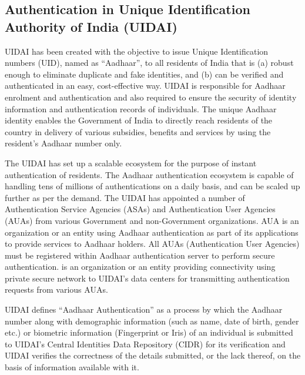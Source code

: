 \begin{multicols}{2}
\section*{Authentication in Unique Identification Authority of India (UIDAI)}

UIDAI has been created with the objective to issue Unique Identification numbers (UID), named as ``Aadhaar'', to all residents of India that is (a) robust enough to eliminate duplicate and fake identities, and (b) can be verified and authenticated in an easy, cost-effective way. UIDAI is responsible for Aadhaar enrolment and authentication and also required to ensure the security of identity information and authentication records of individuals. The unique Aadhaar identity enables the Government of India to directly reach residents of the country in delivery of various subsidies, benefits and services by using the resident's Aadhaar number only.
 
The UIDAI has set up a scalable ecosystem for the purpose of instant authentication of residents. The Aadhaar authentication ecosystem is capable of handling tens of millions of authentications on a daily basis, and can be scaled up further as per the demand. The UIDAI has appointed a number of Authentication Service Agencies (ASAs) and Authentication User Agencies (AUAs) from various Government and non-Government organizations. AUA is an organization or an entity using Aadhaar authentication as part of its applications to provide services to Aadhaar holders. All AUAs (Authentication User Agencies) must be registered within Aadhaar authentication server to perform secure authentication.  is an organization or an entity providing connectivity using private secure network to UIDAI's data centers for transmitting authentication requests from various AUAs.
 
UIDAI defines ``Aadhaar Authentication'' as a process by which the Aadhaar number along with demographic information (such as name, date of birth, gender etc.) or biometric information (Fingerprint or Iris) of an individual is submitted to UIDAI's Central Identities Data Repository (CIDR) for its verification and UIDAI verifies the correctness of the details submitted, or the lack thereof, on the basis of information available with it.
 
\vskip -2pt


\end{multicols}
